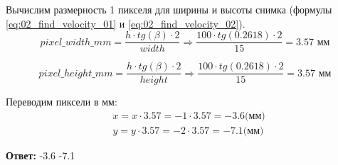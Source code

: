 Вычислим размерность 1 пикселя для ширины и высоты снимка (формулы \ref{eq:02_find_velocity_01} и \ref{eq:02_find_velocity_02}). \\

\begin{equation}
pixel\_width\_mm = \frac{h \cdot tg(\beta) \cdot 2}{width} \Rightarrow
\frac{100 \cdot tg(0.2618) \cdot 2}{15} = 3.57 \text{ мм}
\label{eq:02_find_velocity_01}
\end{equation}

\begin{equation}
pixel\_height\_mm = \frac{h \cdot tg(\beta) \cdot 2}{height} \Rightarrow
\frac{100 \cdot tg(0.2618) \cdot 2}{15} = 3.57 \text{ мм}
\label{eq:02_find_velocity_02}
\end{equation}


Переводим пиксели в мм:
\begin{equation*}
\begin{aligned}
& x = x \cdot 3.57 = -1 \cdot 3.57 = -3.6 \text{(мм)}\\
& y = y \cdot 3.57 = -2 \cdot 3.57 = -7.1 \text{(мм)}
\end{aligned}
\end{equation*}

\textbf{Ответ: } -3.6 -7.1



\codeExample


